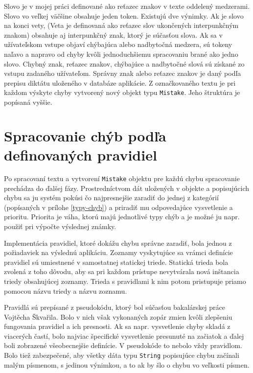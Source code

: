 \documentclass[12pt,oneside]{fithesis2}
\begin{document}
	\par Slovo je v mojej práci definované ako reťazec znakov v texte oddelený medzerami. Slovo vo veľkej väčšine obsahuje jeden token. Existujú dve výnimky. Ak je slovo na konci vety, (Veta je definovaná ako reťazec slov ukončených interpunkčným znakom) obsahuje aj interpunkčný znak, ktorý je súčasťou slova. Ak sa v užívateľskom vstupe objaví chýbajúca alebo nadbytočná medzera, sú tokeny naľavo a napravo od chyby kvôli jednoduchšiemu spracovaniu brané ako jedno slovo. Chybný znak, reťazec znakov, chýbajúce a nadbytočné slová sú získané zo vstupu zadaného užívateľom. Správny znak alebo reťazec znakov je daný podľa prepisu diktátu uloženého v databáze aplikácie. Z označkovaného textu je pri každom výskyte chyby vytvorený nový objekt typu \texttt{Mistake}. Jeho štruktúra je popísaná vyššie.
	
      \section{Spracovanie chýb podľa definovaných pravidiel}
     	  \par Po spracovaní textu a vytvorení \texttt{Mistake} objektu pre každú chybu spracovanie prechádza do ďalšej fázy. Prostredníctvom dát uložených v objekte a popisujúcich chybu sa ju systém pokúsi čo najpresnejšie zaradiť do jednej z kategórií (popísaných v prílohe \ref{typy-chyb}) a priradiť mu odpovedajúce vysvetlenie a prioritu. Priorita je váha, ktorú majú jednotlivé typy chýb a je možné ju napr. použiť pri výpočte výslednej známky.
     	  \par Implementácia pravidiel, ktoré dokážu chybu správne zaradiť, bola jednou z požiadaviek na výslednú aplikáciu. Zoznamy vyskytujúce sa vrámci definície pravidiel sú umiestnené v samostatnej statickej triede. Statická trieda bola zvolená z toho dôvodu, aby sa pri každom prístupe nevytvárala nová inštancia triedy obsahujúcej zoznamy. Trieda s pravidlami k nim potom pristupuje priamo pomocou názvu triedy a názvu zoznamu.
     	  \par Pravidlá sú prepísané z pseudokódu, ktorý bol súčasťou bakalárskej práce Vojtěcha Škvařila\cite{skvaril14}. Bolo v nich však vykonaných zopár zmien kvôli zlepšeniu fungovania pravidiel a ich presnosti. Ak sa napr. vysvetlenie chyby skladá z viacerých častí, bolo najviac špecifické vysvetlenie presunuté na začiatok a ďalej boli zobrazené všeobecnejšie definície. V pseudokóde to nebolo vždy pravidlom. Bolo tiež zabezpečené, aby všetky dáta typu \texttt{String} popisujúce chybu začínali malým písmenom, s jedinou výnimkou, a to ak by šlo o chybu vo veľkosti písmen.
\end{document}
